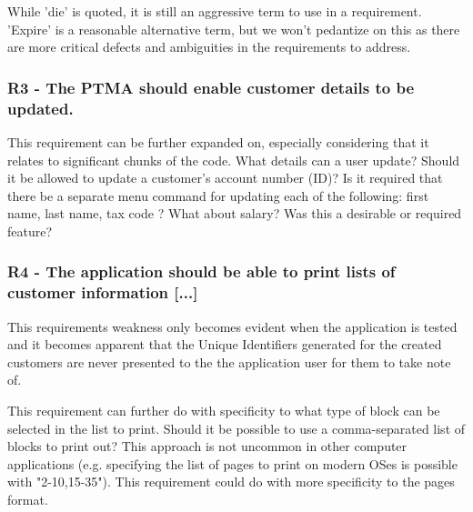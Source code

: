 While 'die' is quoted, it is still an aggressive term to use in a requirement. 'Expire' is a reasonable alternative term, but we won't pedantize on this as there are more critical defects and ambiguities in the requirements to address.

\subsubsection{R3 - The PTMA should enable customer details to be updated.}

This requirement can be further expanded on, especially considering that it relates to significant chunks of the code. 
What details can a user update? Should it be allowed to update a customer's account number (ID)?
Is it required that there be a separate menu command for updating each of the following: first name, last name, tax code ? What about salary? Was this a desirable or required feature?    


\subsubsection{R4 - The application should be able to print lists of customer information [...]} %

This requirements weakness only becomes evident when the application is tested and it becomes apparent that the Unique Identifiers generated for the created customers are never presented to the the application user for them to take note of. 

This requirement can further do with specificity to what type of block can be selected in the list to print. 
Should it be possible to use a comma-separated list of blocks to print out? This approach is not uncommon in other computer applications (e.g. specifying the list of pages to print on modern OSes is possible with "2-10,15-35"). This requirement could do with more specificity to the pages format. 

